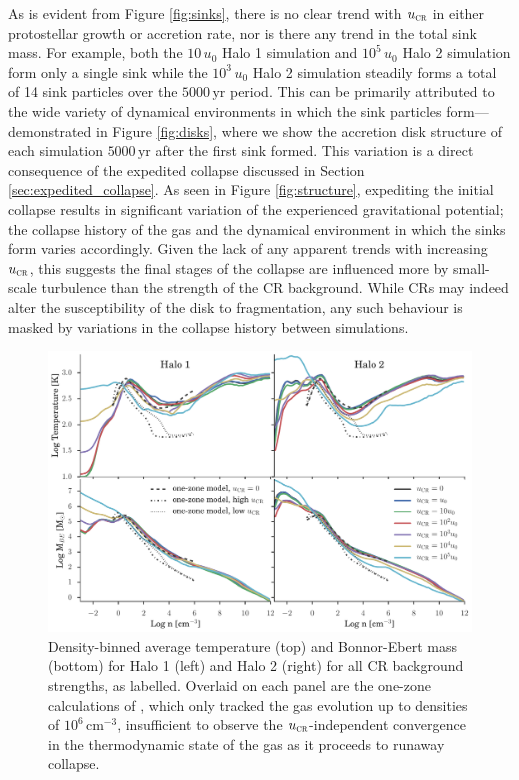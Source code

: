 \documentclass{thesis}
\newcommand{\cc}{\ensuremath{\,\mathrm{cm}^{-3}}\xspace}
\newcommand{\yr}{\ensuremath{\,\mathrm{yr}}\xspace}
\newcommand{\ucr}{\ensuremath{{u}_{\textsc{cr}}}\xspace}
\begin{document}
As is evident from Figure \ref{fig:sinks}, there is no clear trend with $\ucr$ in either protostellar growth or accretion rate, nor is there any trend in the total sink mass.
For example, both the $10\,u_0$ Halo 1 simulation and $10^5\,u_0$ Halo 2 simulation form only a single sink while the $10^3\,u_0$ Halo 2 simulation steadily forms a total of 14 sink particles over the $5000\yr$ period.
This  can be primarily attributed to the wide variety of dynamical environments in which the sink particles form---demonstrated in Figure \ref{fig:disks}, where we show the accretion disk structure of each simulation $5000\yr$ after the first sink formed.
This variation is a direct consequence of the expedited collapse discussed in Section \ref{sec:expedited_collapse}. 
As seen in Figure \ref{fig:structure}, expediting the initial collapse results in significant variation of the experienced gravitational potential; the collapse history of the gas and the dynamical environment in which the sinks form varies accordingly.
Given the lack of any apparent trends with increasing $\ucr$, this suggests the final stages of the collapse are influenced more by small-scale turbulence than the strength of the CR background.
While CRs may indeed alter the susceptibility of the disk to fragmentation, any such behaviour is masked by variations in the collapse history between simulations.

\begin{figure}
\begin{center}
\includegraphics[width=\columnwidth]{figures/binned_T_Mbe/binned_T_Mbe}
\caption{\label{fig:Mbe}
Density-binned average temperature (top) and Bonnor-Ebert mass (bottom) for Halo 1 (left) and Halo 2 (right) for all CR background strengths, as labelled.
Overlaid on each panel are the one-zone calculations of \citet{StacyBromm2007}, which only tracked the gas evolution up to densities of $10^6\cc$, insufficient to observe the $\ucr$-independent convergence in the thermodynamic state of the gas as it proceeds to runaway collapse.%
}
\end{center}
\end{figure}
\end{document}
